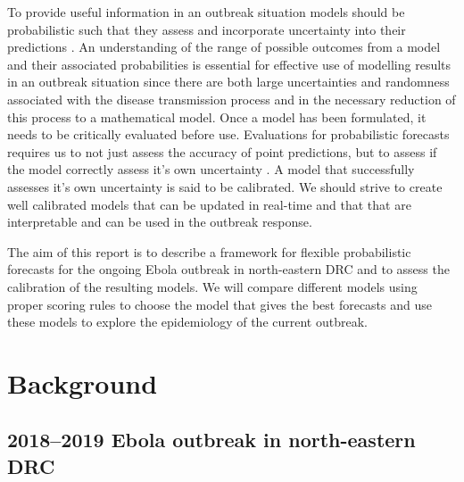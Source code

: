 \documentclass[12pt]{article}
\begin{document}
To provide useful information in an outbreak situation models should be probabilistic such that they assess and incorporate uncertainty into their predictions \cite{funkAssessingPerformanceRealtime2019, weiCalibrationTestsCount2014,heldProbabilisticForecastingInfectious2017,gneitingEditorialProbabilisticForecasting2008}. An understanding of the range of possible outcomes from a model and their associated probabilities is essential for effective use of modelling results in an outbreak situation since there are both large uncertainties and randomness associated with the disease transmission process and in the necessary reduction of this process to a mathematical model. Once a model has been formulated, it needs to be critically evaluated before use. Evaluations for probabilistic forecasts requires us to not just assess the accuracy of point predictions, but to assess if the model correctly assess it's own uncertainty \cite{gneitingProbabilisticForecastsCalibration2007, czadoPredictiveModelAssessment2009}. A model that successfully assesses it's own uncertainty is said to be calibrated. We should strive to create well calibrated models that can be updated in real-time and that that are interpretable and can be used in the outbreak response. 

The aim of this report is to describe a framework for flexible probabilistic forecasts for the ongoing Ebola outbreak in north-eastern DRC and to assess the calibration of the resulting models. We will compare different models using proper scoring rules to choose the model that gives the best forecasts and use these models to explore the epidemiology of the current outbreak. 

\section{Background}
\subsection{2018--2019 Ebola outbreak in north-eastern DRC}
\end{document}
